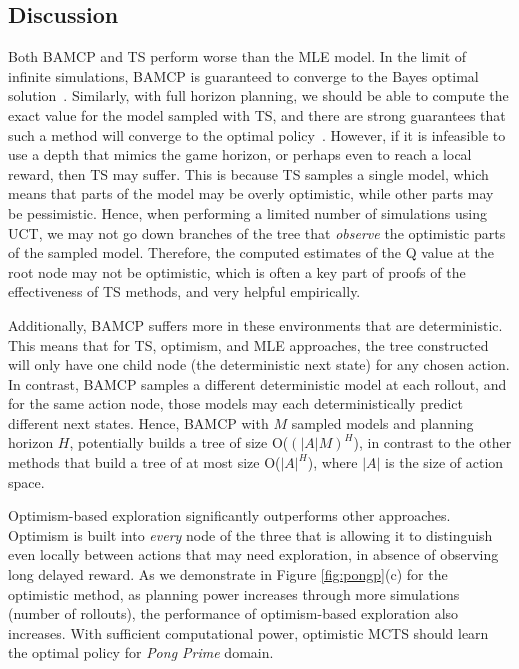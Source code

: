 \subsection{Discussion}\label{sec:exp_disc}

Both BAMCP and TS perform worse than the MLE model. In the limit of infinite simulations, BAMCP is guaranteed to converge to the Bayes optimal solution~\citep{guez2012efficient}. Similarly, with full horizon planning, we should be able to compute the exact value for the model sampled with TS, and there are strong guarantees that such a method will converge to the optimal policy~\citep{osband2016posterior}. 
However, if it is infeasible to use a depth that mimics the game horizon, or perhaps even to reach a local reward, then TS may suffer. This is because TS samples a single model, which means that parts of the model may be overly optimistic, while other parts may be pessimistic. Hence, when performing a limited number of simulations using UCT, we may not go down branches of the tree that \textit{observe} the optimistic parts of the sampled model. Therefore, the computed estimates of the Q value at the root node may not be optimistic, which is often a key part of proofs of the effectiveness of TS methods, and very helpful empirically. %

Additionally, BAMCP suffers more in these environments that are deterministic. This means that for TS, optimism, and MLE approaches, the tree constructed will only have one child node (the deterministic next state) for any chosen action. In contrast, BAMCP samples a different deterministic model at each rollout, and for the same action node, those models may each deterministically predict different next states. Hence, BAMCP with $M$ sampled models and planning horizon $H$, potentially builds a tree of size O($(|A|M)^H$), in contrast to the other methods that build a tree of at most size O($|A|^H$), where $|A|$ is the size of action space.

Optimism-based exploration significantly outperforms other approaches. Optimism is built into \textit{every} node of the three that is allowing it to distinguish even locally between actions that may need exploration, in absence of observing long delayed reward. As we demonstrate in Figure \ref{fig:pongp}(c) for the optimistic method, as planning power increases through more simulations (number of rollouts), the performance of optimism-based exploration also increases. With sufficient computational power, optimistic MCTS should learn the optimal policy for \textit{Pong Prime} domain. 



